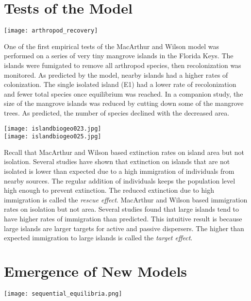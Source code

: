 \documentclass[letterpaper]{tufte-handout}
\begin{document}
\section{Tests of the Model}

\begin{marginfigure}%
	\centering
	\texttt{[image: arthropod\_recovery]}
\end{marginfigure} 

One of the first empirical tests of the MacArthur and Wilson model was performed on a series of very tiny mangrove islands in the Florida Keys. The islands were fumigated to remove all arthropod species, then recolonization was monitored. As predicted by the model, nearby islands had a higher rates of colonization. The single isolated island (E1) had a lower rate of recolonization and fewer total species once equilibrium was reached. In a companion study, the size of the mangrove islands was reduced by cutting down some of the mangrove trees. As predicted, the number of species declined with the decreased area.

\begin{marginfigure}%
	\centering
	\texttt{[image: islandbiogeo023.jpg]}\\
	\texttt{[image: islandbiogeo025.jpg]}
\end{marginfigure} 

Recall that MacArthur and Wilson based extinction rates on island area but not isolation.  Several studies have shown that extinction on islands that are not isolated is lower than expected due to a high immigration of individuals from nearby sources. The regular addition of individuals keeps the population level high enough to prevent extinction. The reduced extinction due to high immigration is called the \textit{rescue effect}.  MacArthur and Wilson based immigration rates on isolation but not area.  Several studies found that large islands tend to have higher rates of immigration than predicted. This intuitive result is because large islands are larger targets for active and passive dispersers.  The higher than expected immigration to large islands is called the \textit{target effect}.


\section{Emergence of New Models}
\begin{marginfigure}%
	\centering
	\texttt{[image: sequential\_equilibria.png]}\\
\end{marginfigure} 
\end{document}
